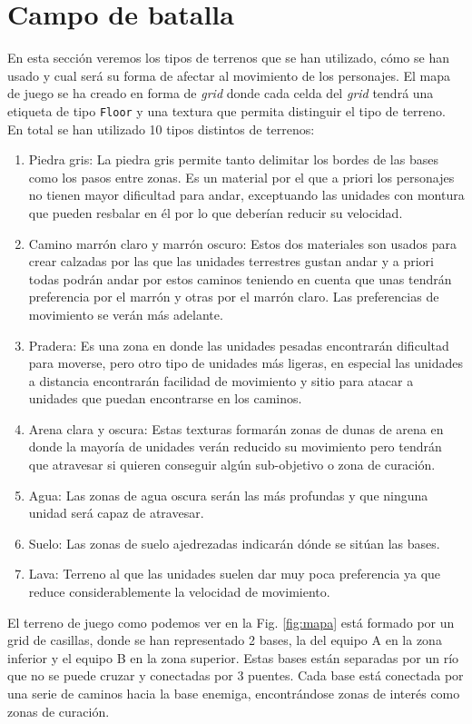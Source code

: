 \section{Campo de batalla}

En esta sección veremos los tipos de terrenos que se han utilizado, cómo se han usado y cual será su forma de afectar al movimiento de los personajes. El mapa de juego se ha creado en forma de \textit{grid} donde cada celda del \textit{grid} tendrá una etiqueta de tipo \texttt{Floor} y una textura que permita distinguir el tipo de terreno. En total se han utilizado 10 tipos distintos de terrenos:

\begin{enumerate}
    \item Piedra gris: La piedra gris permite tanto delimitar los bordes de las bases como los pasos entre zonas. Es un material por el que a priori los personajes no tienen mayor dificultad para andar, exceptuando las unidades con montura que pueden resbalar en él por lo que deberían reducir su velocidad.  
    \item Camino marrón claro y marrón oscuro: Estos dos materiales son usados para crear calzadas por las que las unidades terrestres gustan andar y a priori todas podrán andar por estos caminos teniendo en cuenta que unas tendrán preferencia por el marrón y otras por el marrón claro. Las preferencias de movimiento se verán más adelante.
    \item Pradera: Es una zona en donde las unidades pesadas encontrarán dificultad para moverse, pero otro tipo de unidades más ligeras, en especial las unidades a distancia encontrarán facilidad de movimiento y sitio para atacar a unidades que puedan encontrarse en los caminos.
    \item Arena clara y oscura: Estas texturas formarán zonas de dunas de arena en donde la mayoría de unidades verán reducido su movimiento pero tendrán que atravesar si quieren conseguir algún sub-objetivo o zona de curación. 
    \item Agua: Las zonas de agua oscura serán las más profundas y que ninguna unidad será capaz de atravesar.
    \item Suelo: Las zonas de suelo ajedrezadas indicarán dónde se sitúan las bases. 
    \item Lava: Terreno al que las unidades suelen dar muy poca preferencia ya que reduce considerablemente la velocidad de movimiento.
\end{enumerate}

El terreno de juego como podemos ver en la Fig. \ref{fig:mapa} está formado por un grid de  casillas, donde se han representado 2 bases, la del equipo A en la zona inferior y el equipo B en la zona superior. Estas bases están separadas por un río que no se puede cruzar y conectadas por 3 puentes. Cada base está conectada por una serie de caminos hacia la base enemiga, encontrándose zonas de interés como zonas de curación.

